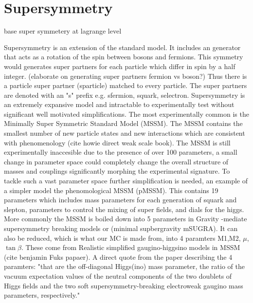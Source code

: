 \section{Supersymmetry}

base super symmetery at lagrange level

Supersymmetry is an extension of the standard model. It includes an generator that acts as a rotation of the spin between bosons and fermions. This symmetry would generates super partners for each particle which differ in spin by a half integer. (elaborate on generating super partners fermion vs boson?) Thus there is a particle super partner (sparticle) matched to every particle. The super partners are denoted with an "s" prefix e.g. sfermion, squark, selectron. Supersymmetry is an extremely expansive model and intractable to experimentally test without significant well motivated simplifications. The most experimentally common is the Minimally Super Symmetric Standard Model (MSSM). The MSSM contains the smallest number of new particle states and new interactions which are consistent with phenomenology (cite howie direct weak scale book). The MSSM is still experimentally inaccesible due to the presence of over 100 parameters, a small change in parameter space could completely change the overall structure of masses and couplings significantly morphing the experimental signature. To tackle such a vast parameter space further simplification is needed, an example of a simpler model the phenomological MSSM (pMSSM). This contains 19 parameters which includes mass parameters for each generation of squark and slepton, parameters to control the mixing of super fields, and dials for the higgs.  More commonly the MSSM is boiled down into 5 parameters in Gravity -mediate supersymmetry breaking models or (minimal supbergravity mSUGRA). It can also be reduced, which is what our MC is made from, into 4 paramters M1,M2, $\mu$, $\tan\beta$. These come from Realistic simplified gaugino-higgsino models in MSSM (cite benjamin Fuks papaer). A direct quote from the paper describing the 4 paramters: "that are the off-diagonal Higgs(ino) mass parameter, the ratio of the vacuum expectation values of the neutral components of the two doublets of Higgs fields and the two soft
supersymmetry-breaking electroweak gaugino mass parameters, respectively."


